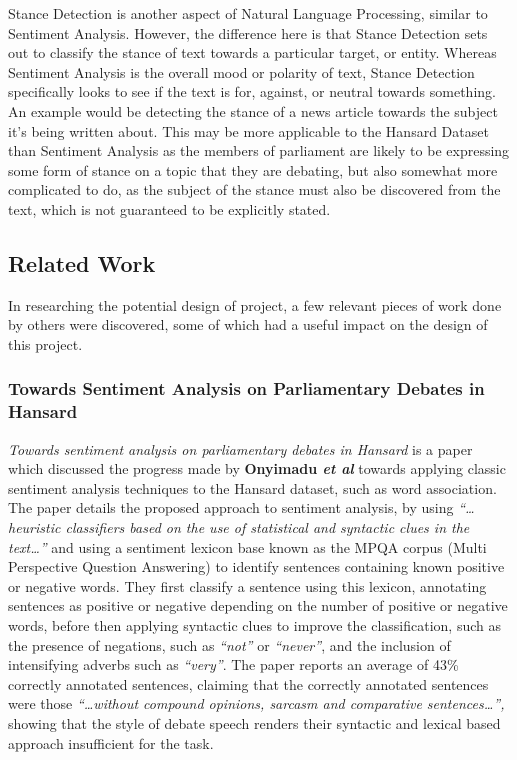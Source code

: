 Stance Detection is another aspect of Natural Language Processing, similar to Sentiment Analysis. However, the difference here is that Stance Detection sets out to classify the stance of text towards a particular target, or entity. Whereas Sentiment Analysis is the overall mood or polarity of text, Stance Detection specifically looks to see if the text is for, against, or neutral towards something\cite{Augenstein2016}. An example would be detecting the stance of a news article towards the subject it's being written about. This may be more applicable to the Hansard Dataset than Sentiment Analysis as the members of parliament are likely to be expressing some form of stance on a topic that they are debating, but also somewhat more complicated to do, as the subject of the stance must also be discovered from the text, which is not guaranteed to be explicitly stated.

\subsection{Related Work}
\label{sec:bck_related}

In researching the potential design of project, a few relevant pieces of work done by others were discovered, some of which had a useful impact on the design of this project. 

\subsubsection{Towards Sentiment Analysis on Parliamentary Debates in Hansard}
\emph{Towards sentiment analysis on parliamentary debates in Hansard}\cite{Onyimadu2014} is a paper which discussed the progress made by \textbf{Onyimadu \emph{et al}} towards applying classic sentiment analysis techniques to the Hansard dataset, such as word association. The paper details the proposed approach to sentiment analysis, by using \emph{“…heuristic classifiers based on the use of statistical and syntactic clues in the text…”} and using a sentiment lexicon base known as the MPQA corpus (Multi Perspective Question Answering) to identify sentences containing known positive or negative words. They first classify a sentence using this lexicon, annotating sentences as positive or negative depending on the number of positive or negative words, before then applying syntactic clues to improve the classification, such as the presence of negations, such as \emph{“not”} or \emph{“never”}, and the inclusion of intensifying adverbs such as \emph{“very”}. The paper reports an average of 43\% correctly annotated sentences, claiming that the correctly annotated sentences were those \emph{“…without compound opinions, sarcasm and comparative sentences…”,} showing that the style of debate speech renders their syntactic and lexical based approach insufficient for the task.


